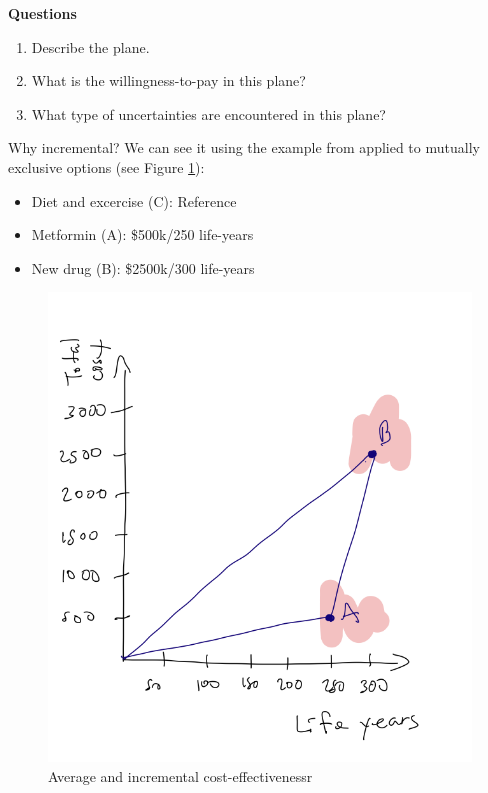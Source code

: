 \documentclass[
]{book}
\providecommand{\tightlist}{%
  \setlength{\itemsep}{0pt}\setlength{\parskip}{0pt}}
\begin{document}
\textbf{Questions}

\begin{enumerate}
\def\labelenumi{\arabic{enumi}.}
\tightlist
\item
  Describe the plane.
\item
  What is the willingness-to-pay in this plane?
\item
  What type of uncertainties are encountered in this plane?
\end{enumerate}

Why incremental? We can see it using the example from \citet{gray2011applied} applied to mutually exclusive options (see Figure \ref{fig:fig3}):

\begin{itemize}
\tightlist
\item
  Diet and excercise (C): Reference
\item
  Metformin (A): \$500k/250 life-years
\item
  New drug (B): \$2500k/300 life-years
\end{itemize}

\begin{figure}

{\centering \includegraphics[width=9.25in]{images/fig3} 

}

\caption{Average and incremental cost-effectivenessr}\label{fig:fig3}
\end{figure}
\end{document}
